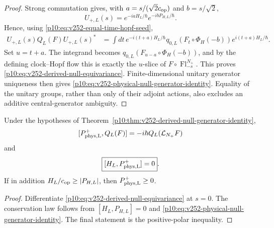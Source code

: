 \documentclass[12pt,a4paper]{article}
\begin{document}
\begin{proof}
Strong commutation gives, with
\(a=s/(\sqrt2c_{\rm op})\) and \(b=s/\sqrt2\),
\[
 U_{+,L}(s)=e^{-iaH_L/\hbar}e^{-ibP_{H,L}/\hbar}.
\]
Hence, using \eqref{p10:eq:v252-equal-time-hopf-seed},
\begin{align*}
 U_{+,L}(s)Q_L(F)U_{+,L}(s)^*
 &=\int dt\,
 e^{-i(t+a)H_L/\hbar}
 q_{0,L}(F_t\circ\Phi_H(-b))
 e^{i(t+a)H_L/\hbar}.
\end{align*}
Set \(u=t+a\).  The integrand becomes
\(q_{0,L}(F_{u-a}\circ\Phi_H(-b))\), and by the defining clock--Hopf
flow this is exactly the \(u\)-slice of
\(F\circ\operatorname{Fl}^{N_+}_{-s}\).  This proves
\eqref{p10:eq:v252-derived-null-equivariance}.  Finite-dimensional unitary
generator uniqueness then gives
\eqref{p10:eq:v252-physical-null-generator-identity}.  Equality of the
unitary groups, rather than only of their adjoint actions, also excludes an
additive central-generator ambiguity.
\end{proof}

\begin{corollary}
\label{p10:cor:v252-null-generator-conservation}
Under the hypotheses of
Theorem~\ref{p10:thm:v252-derived-null-generator-identity},
\begin{equation}
\label{p10:eq:v252-infinitesimal-null-covariance}
 [P_{\rm phys,L}^+,Q_L(F)]
 =-i\hbar Q_L(\mathcal L_{N_+}F)
\end{equation}
and
\begin{equation}
\label{p10:eq:v252-total-null-conservation}
 \boxed{[H_L,P_{\rm phys,L}^+]=0}.
\end{equation}
If in addition \(H_L/c_{\rm op}\ge |P_{H,L}|\), then
\(P_{\rm phys,L}^+\ge0\).
\end{corollary}
\begin{proof}
Differentiate
\eqref{p10:eq:v252-derived-null-equivariance} at \(s=0\).  The conservation
law follows from
\([H_L,P_{H,L}]=0\) and
\eqref{p10:eq:v252-physical-null-generator-identity}.  The final statement is
the positive-polar inequality.
\end{proof}
\end{document}
